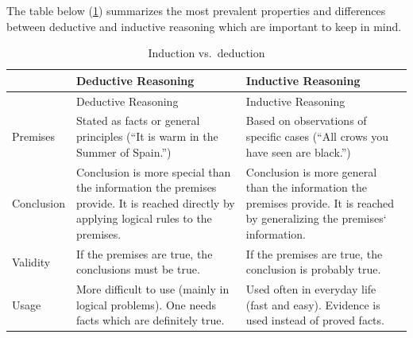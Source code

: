 \documentclass[
]{krantz}
\begin{document}
The table below (\ref{tab:IndDed}) summarizes the most prevalent properties and differences between deductive and inductive reasoning which are important to keep in mind.

\begin{longtable}[]{@{}
  >{\raggedright\arraybackslash}p{}
  >{\raggedright\arraybackslash}p{}
  >{\raggedright\arraybackslash}p{}@{}}
\caption{\label{tab:IndDed} Induction vs.~deduction}\tabularnewline
\toprule\noalign{}
\begin{minipage}[b]{\linewidth}\raggedright
\end{minipage} & \begin{minipage}[b]{\linewidth}\raggedright
Deductive Reasoning
\end{minipage} & \begin{minipage}[b]{\linewidth}\raggedright
Inductive Reasoning
\end{minipage} \\
\midrule\noalign{}
\endfirsthead
\toprule\noalign{}
\begin{minipage}[b]{\linewidth}\raggedright
\end{minipage} & \begin{minipage}[b]{\linewidth}\raggedright
Deductive Reasoning
\end{minipage} & \begin{minipage}[b]{\linewidth}\raggedright
Inductive Reasoning
\end{minipage} \\
\midrule\noalign{}
\endhead
\bottomrule\noalign{}
\endlastfoot
Premises & Stated as facts or general principles (``It is warm in the Summer of Spain.'') & Based on observations of specific cases (``All crows you have seen are black.'') \\
Conclusion & Conclusion is more special than the information the premises provide. It is reached directly by applying logical rules to the premises. & Conclusion is more general than the information the premises provide. It is reached by generalizing the premises` information. \\
Validity & If the premises are true, the conclusions must be true. & If the premises are true, the conclusion is probably true. \\
Usage & More difficult to use (mainly in logical problems). One needs facts which are definitely true. & Used often in everyday life (fast and easy). Evidence is used instead of proved facts. \\
\end{longtable}
\end{document}
